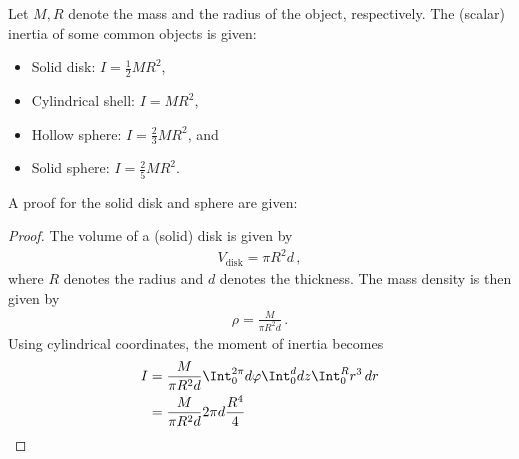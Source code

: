 
    \begin{example}
        Let $M,R$ denote the mass and the radius of the object, respectively. The (scalar) inertia of some common objects is given:
        \begin{itemize}
            \item Solid disk: $I = \frac{1}{2}MR^2$,
            \item Cylindrical shell: $I = MR^2$,
            \item Hollow sphere: $I = \frac{2}{3}MR^2$, and
            \item Solid sphere: $I = \frac{2}{5}MR^2$.
        \end{itemize}
        A proof for the solid disk and sphere are given:
        \begin{mdframed}[roundcorner=10pt, linecolor=blue, linewidth=1pt]
            \begin{proof}
                The volume of a (solid) disk is given by
                \begin{gather*}
                    V_{\text{disk}}=\pi R^2d\,,
                \end{gather*}
                where $R$ denotes the radius and $d$ denotes the thickness. The mass density is then given by
                \begin{gather*}
                    \rho=\frac{M}{\pi R^2d}\,.
                \end{gather*}
                Using cylindrical coordinates, the moment of inertia becomes
                \begin{align*}
                    I &= \frac{M}{\pi R^2d}\Int_0^{2\pi}d\varphi\Int_0^ddz\Int_0^Rr^3\,dr\\
                    &= \frac{M}{\pi R^2d}2\pi d\frac{R^4}{4}\\

\end{align*}
\end{proof}
\end{mdframed}
\end{example}
